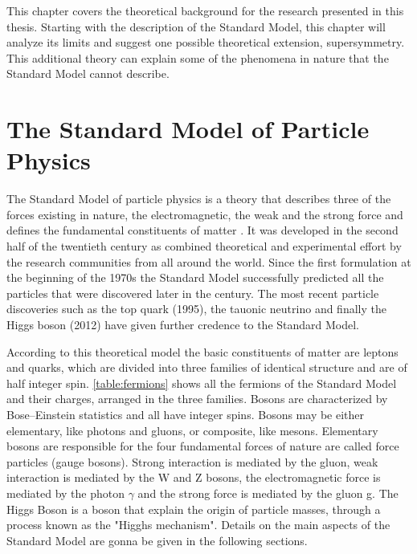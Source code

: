 
This chapter covers the theoretical background for the research presented in this thesis. Starting with the description of the Standard Model, this chapter will analyze its limits and suggest one possible theoretical extension, supersymmetry. This additional theory can explain some of the phenomena in nature that the Standard Model cannot describe.

\section{The Standard Model of Particle Physics}

The Standard Model of particle physics is a theory that describes three of the forces existing in nature, the electromagnetic, the weak and the strong force and defines the fundamental constituents of matter \cite{Spiesberger:2000ks}. It was developed in the second half of the twentieth century as combined theoretical and experimental effort by the research communities from all around the world. Since the first formulation at the beginning of the 1970s the Standard Model successfully predicted all the particles that were discovered later in the century. The most recent particle discoveries such as the top quark \cite{Campagnari:1996ai} (1995), the tauonic neutrino \cite{Agafonova:2015jxn} and finally the Higgs boson \cite{Aad:2012tfa,Chatrchyan:2012xdj}(2012) have given further credence to the Standard Model. 

According to this theoretical model the basic constituents of matter are leptons and quarks, which are divided into three families of identical structure and are of half integer spin. \autoref{table:fermions} shows all the fermions of the Standard Model and their charges, arranged in the three families. Bosons are characterized by Bose–Einstein statistics and all have integer spins. Bosons may be either elementary, like photons and gluons, or composite, like mesons. Elementary bosons are responsible for the four fundamental forces of nature are called force particles (gauge bosons). Strong interaction is mediated by the gluon, weak interaction is mediated by the W and Z bosons, the electromagnetic force is mediated by the photon $\gamma$ and the strong force is mediated by the gluon g. The Higgs Boson is a boson that explain the origin of particle masses, through a process known as the "Higghs mechanism". Details on the main aspects of the Standard Model are gonna be given in the following sections.

